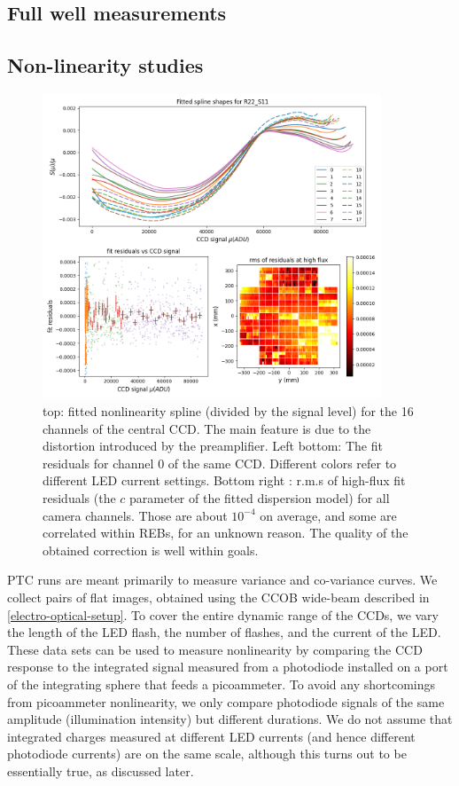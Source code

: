 \subsection{Full well measurements}\label{fullwell}

\subsection{Non-linearity studies}\label{nonlinearity}
\begin{figure}[h]
\begin{centering}
\includegraphics[width=0.9\textwidth]{figures/nonlin_plots.png}
\end{centering}
\caption{top: fitted nonlinearity spline (divided by the signal level) for the 16 channels of the central CCD. The main feature is due to the distortion introduced by the preamplifier. Left bottom: The fit residuals for channel 0 of the same CCD. Different colors refer to different LED current settings. Bottom right : r.m.s of high-flux fit residuals (the $c$ parameter of the fitted dispersion model) for all camera channels. Those are about $10^{-4}$ on average, and some are correlated within REBs, for an unknown reason. The quality of the obtained correction is well within goals.\label{fig:nonlin_model}}

\end{figure}

PTC runs are meant primarily to measure variance and co-variance curves. We collect pairs of flat images, obtained using the CCOB wide-beam described in \ref{electro-optical-setup}. To cover the entire dynamic range of the CCDs, we vary the length of the LED flash, the number of flashes, and the current of the LED. These data sets can be used to measure nonlinearity by comparing the CCD response to the integrated signal measured from a photodiode installed on a port of the integrating sphere that feeds a picoammeter. To avoid any shortcomings from picoammeter nonlinearity, we only compare photodiode signals of the same amplitude (illumination intensity) but different durations. We do not assume that integrated charges measured at different LED currents (and hence different photodiode currents) are on the same scale, although this turns out to be essentially true, as discussed later. 

